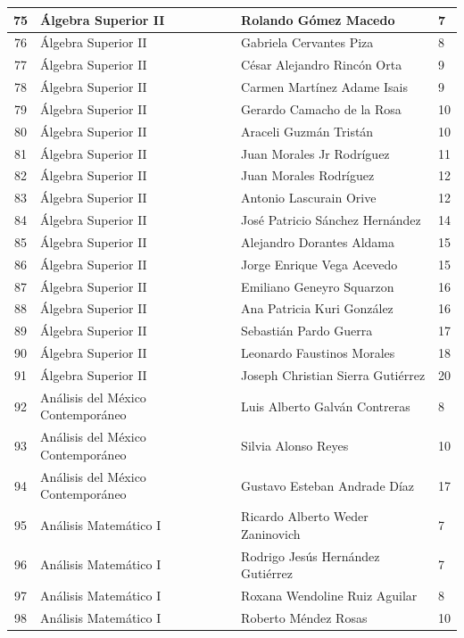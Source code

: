 {\begin{longtable}{|c|p{6.5cm}|p{5cm}|p{1.5cm}|}
  75 & Álgebra Superior II & Rolando Gómez Macedo & 7 \\ \hline
  76 & Álgebra Superior II & Gabriela Cervantes Piza & 8 \\ \hline
  77 & Álgebra Superior II & César Alejandro Rincón Orta & 9 \\ \hline
  78 & Álgebra Superior II & Carmen Martínez Adame Isais & 9 \\ \hline
  79 & Álgebra Superior II & Gerardo Camacho de la Rosa & 10 \\ \hline
  80 & Álgebra Superior II & Araceli Guzmán Tristán & 10 \\ \hline
  81 & Álgebra Superior II & Juan Morales Jr Rodríguez & 11 \\ \hline
  82 & Álgebra Superior II & Juan Morales Rodríguez & 12 \\ \hline
  83 & Álgebra Superior II & Antonio Lascurain Orive & 12 \\ \hline
  84 & Álgebra Superior II & José Patricio Sánchez Hernández & 14 \\ \hline
  85 & Álgebra Superior II & Alejandro Dorantes Aldama & 15 \\ \hline
  86 & Álgebra Superior II & Jorge Enrique Vega Acevedo & 15 \\ \hline
  87 & Álgebra Superior II & Emiliano Geneyro Squarzon & 16 \\ \hline
  88 & Álgebra Superior II & Ana Patricia Kuri González & 16 \\ \hline
  89 & Álgebra Superior II & Sebastián Pardo Guerra & 17 \\ \hline
  90 & Álgebra Superior II & Leonardo Faustinos Morales & 18 \\ \hline
  91 & Álgebra Superior II & Joseph Christian Sierra Gutiérrez & 20 \\ \hline
  92 & Análisis del México Contemporáneo & Luis Alberto Galván Contreras & 8 \\ \hline
  93 & Análisis del México Contemporáneo & Silvia Alonso Reyes & 10 \\ \hline
  94 & Análisis del México Contemporáneo & Gustavo Esteban Andrade Díaz & 17 \\ \hline
  95 & Análisis Matemático I & Ricardo Alberto Weder Zaninovich & 7 \\ \hline
  96 & Análisis Matemático I & Rodrigo Jesús Hernández Gutiérrez & 7 \\ \hline
  97 & Análisis Matemático I & Roxana Wendoline Ruiz Aguilar & 8 \\ \hline
  98 & Análisis Matemático I & Roberto Méndez Rosas & 10 \\ \hline

\end{longtable}}
